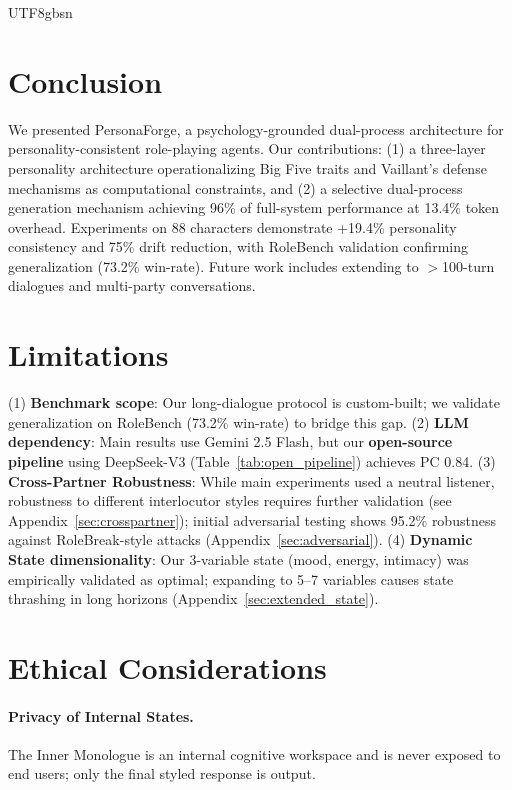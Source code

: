 \documentclass[11pt]{article}
\begin{document}
\begin{CJK*}{UTF8}{gbsn}
\section{Conclusion}

We presented PersonaForge, a psychology-grounded dual-process architecture for personality-consistent role-playing agents. Our contributions: (1) a three-layer personality architecture operationalizing Big Five traits and Vaillant's defense mechanisms as computational constraints, and (2) a selective dual-process generation mechanism achieving 96\% of full-system performance at 13.4\% token overhead. Experiments on 88 characters demonstrate +19.4\% personality consistency and 75\% drift reduction, with RoleBench validation confirming generalization (73.2\% win-rate). Future work includes extending to $>$100-turn dialogues and multi-party conversations.

\newpage
\section*{Limitations}

(1) \textbf{Benchmark scope}: Our long-dialogue protocol is custom-built; we validate generalization on RoleBench (73.2\% win-rate) to bridge this gap. (2) \textbf{LLM dependency}: Main results use Gemini 2.5 Flash, but our \textbf{open-source pipeline} using DeepSeek-V3 (Table~\ref{tab:open_pipeline}) achieves PC 0.84. (3) \textbf{Cross-Partner Robustness}: While main experiments used a neutral listener, robustness to different interlocutor styles requires further validation (see Appendix~\ref{sec:crosspartner}); initial adversarial testing shows 95.2\% robustness against RoleBreak-style attacks (Appendix~\ref{sec:adversarial}). (4) \textbf{Dynamic State dimensionality}: Our 3-variable state (mood, energy, intimacy) was empirically validated as optimal; expanding to 5--7 variables causes state thrashing in long horizons (Appendix~\ref{sec:extended_state}).

\section*{Ethical Considerations}

\paragraph{Privacy of Internal States.} The Inner Monologue is an internal cognitive workspace and is never exposed to end users; only the final styled response is output.


\end{CJK*}
\end{document}
